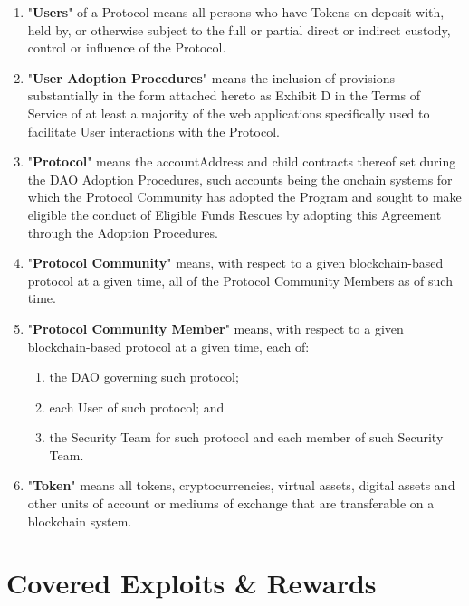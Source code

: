 \documentclass{article}
\begin{document}
\begin{enumerate}
    \item "\textbf{Users}" of a Protocol means all persons who have Tokens on deposit with, held by, or otherwise subject to the full or partial direct or indirect custody, control or influence of the Protocol.

    \item "\textbf{User Adoption Procedures}" means the inclusion of provisions substantially in the form attached hereto as Exhibit D in the Terms of Service of at least a majority of the web applications specifically used to facilitate User interactions with the Protocol.

    \item "\textbf{Protocol}" means the accountAddress and child contracts thereof set during the DAO Adoption Procedures, such accounts being the onchain systems for which the Protocol Community has adopted the Program and sought to make eligible the conduct of Eligible Funds Rescues by adopting this Agreement through the Adoption Procedures.

    \item "\textbf{Protocol Community}" means, with respect to a given blockchain-based protocol at a given time, all of the Protocol Community Members as of such time.

    \item "\textbf{Protocol Community Member}" means, with respect to a given blockchain-based protocol at a given time, each of:

          \begin{enumerate}
              \item the DAO governing such protocol;
              \item each User of such protocol; and
              \item the Security Team for such protocol and each member of such Security Team.

          \end{enumerate}

    \item "\textbf{Token}" means all tokens, cryptocurrencies, virtual assets, digital assets and other units of account or mediums of exchange that are transferable on a blockchain system.
\end{enumerate}

\section{Covered Exploits \& Rewards}\label{sec:covered}
\end{document}
